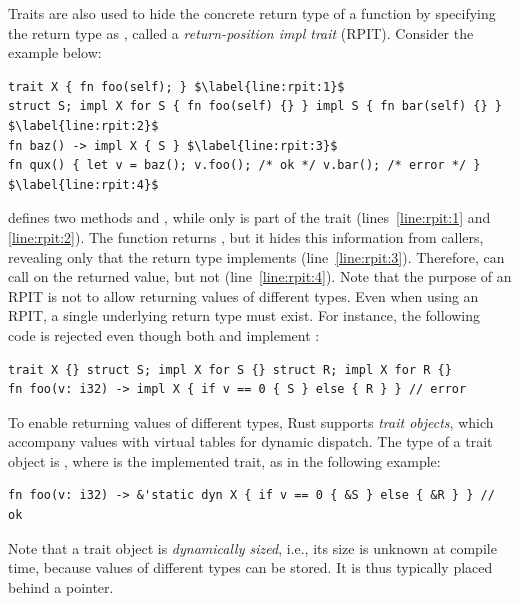 Traits are also used to hide the concrete return type of a function by
specifying the return type as , called a \emph{return-position impl
trait} (RPIT).
%
Consider the example below:

\vspace{-0.5em}
\begin{lstlisting}
trait X { fn foo(self); } $\label{line:rpit:1}$
struct S; impl X for S { fn foo(self) {} } impl S { fn bar(self) {} } $\label{line:rpit:2}$
fn baz() -> impl X { S } $\label{line:rpit:3}$
fn qux() { let v = baz(); v.foo(); /* ok */ v.bar(); /* error */ } $\label{line:rpit:4}$
\end{lstlisting}
\vspace{-0.5em}

\noindent
%
 defines two methods  and , while only  is part of the
trait  (lines~\ref{line:rpit:1} and \ref{line:rpit:2}).
%
The function  returns , but it hides this information from callers,
revealing only that the return type implements  (line~\ref{line:rpit:3}).
%
Therefore,  can call  on the returned value, but not 
(line~\ref{line:rpit:4}).
%
Note that the purpose of an RPIT is not to allow returning values of different
types.
%
Even when using an RPIT, a single underlying return type must exist.
%
For instance, the following code is rejected even though both  and 
implement :

\vspace{-0.5em}
\begin{lstlisting}
trait X {} struct S; impl X for S {} struct R; impl X for R {}
fn foo(v: i32) -> impl X { if v == 0 { S } else { R } } // error
\end{lstlisting}
\vspace{-0.5em}

To enable returning values of different types, Rust supports \emph{trait
objects}, which accompany values with virtual tables for dynamic dispatch.
%
The type of a trait object is , where  is the implemented trait,
as in the following example:

\vspace{-0.5em}
\begin{lstlisting}
fn foo(v: i32) -> &'static dyn X { if v == 0 { &S } else { &R } } // ok
\end{lstlisting}
\vspace{-0.5em}

\noindent
%
Note that a trait object is \emph{dynamically sized}, i.e., its size is unknown
at compile time, because values of different types can be stored.
%
It is thus typically placed behind a pointer.

